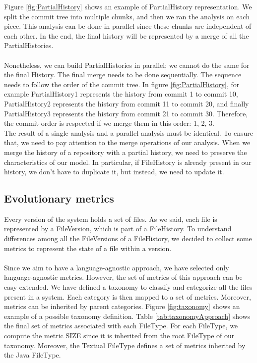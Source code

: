 Figure \ref{fig:PartialHistory} shows an example of PartialHistory representation. 
We split the commit tree into multiple chunks, and then we ran the analysis on each piece. 
This analysis can be done in parallel since these chunks are independent of each other. 
In the end, the final history will be represented by a merge of all the PartialHistories. \\
\\
Nonetheless, we can build PartialHistories in parallel; we cannot do the same for the final History. 
The final merge needs to be done sequentially. The sequence needs to follow the order of the commit tree. 
In figure \ref{fig:PartialHistory}, for example
PartialHistory1 represents the history from commit 1 to commit 10, 
PartialHistory2 represents the history from commit 11 to commit 20, and finally 
PartialHistory3 represents the history from commit 21 to commit 30.
Therefore, the commit order is respected if we merge them in this order: 1, 2, 3. 
\\
The result of a single analysis and a parallel analysis must be identical. 
To ensure that, we need to pay attention to the merge operations of our analysis.
When we merge the history of a repository with a partial history, we need to preserve the characteristics of our model. 
In particular, if FileHistory is already present in our history, we don't have to duplicate it, but instead, we need to update it. 

\label{s:evolutionaryMetrics}
\subsection*{Evolutionary metrics}
Every version of the system holds a set of files. 
As we said, each file is represented by a FileVersion, which is part of a FileHistory. 
To understand differences among all the FileVersions of a FileHistory,
we decided to collect some metrics to represent the state of a file within a version.\\
\\
Since we aim to have a language-agnostic approach, we have selected only language-agnostic metrics. 
However, the set of metrics of this approach can be easy extended.
We have defined a taxonomy to classify and categorize all the files present in a system. 
Each category is then mapped to a set of metrics. Moreover, metrics can be inherited by parent categories. 
Figure \ref{fig:taxonomy} shows an example of a possible taxonomy definition. Table \ref{tab:taxonomyApproach} shows the final set of metrics associated with each FileType. For each FileType, we compute the metric SIZE since it is inherited from the root FileType of our taxonomy. Moreover, the Textual FileType defines a set of metrics inherited by the Java FileType. 
\\


